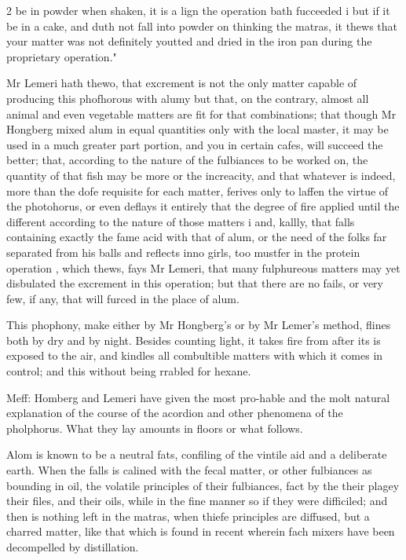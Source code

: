 \documentclass[10pt]{article}
\begin{document}
\begin{multicols}{2}\raggedcolumns
be in powder when shaken, it is a lign the operation bath fucceeded i but if it be in a cake, and duth not fall into powder on thinking the matras, it thews that your matter was not definitely youtted and dried in the iron pan during the proprietary operation."

Mr Lemeri hath thewo, that excrement is not the only matter capable of producing this phofhorous with alumy but that, on the contrary, almost all animal and even vegetable matters are fit for that combinations; that though Mr Hongberg mixed alum in equal quantities only with the local master, it may be used in a much greater part portion, and you in certain cafes, will succeed the better; that, according to the nature of the fulbiances to be worked on, the quantity of that fish may be more or the increacity, and that whatever is indeed, more than the dofe requisite for each matter, ferives only to laffen the virtue of the photohorus, or even deflays it entirely that the degree of fire applied until the different according to the nature of those matters i and, kallly, that falls containing exactly the fame acid with that of alum, or the need of the folks far separated from his balls and reflects inno girls, too mustfer in the protein operation , which thews, fays Mr Lemeri, that many fulphureous matters may yet disbulated the excrement in this operation; but that there are no fails, or very few, if any, that will furced in the place of alum.

This phophony, make either by Mr Hongberg’s or by Mr Lemer’s method, flines both by dry and by night. Besides counting light, it takes fire from after its is exposed to the air, and kindles all combultible matters with which it comes in control; and this without being rrabled for hexane.

Meff: Homberg and Lemeri have given the most pro-hable and the molt natural explanation of the course of the acordion and other phenomena of the pholphorus. What they lay amounts in floors or what follows.

Alom is known to be a neutral fats, confiling of the vintile aid and a deliberate earth. When the falls is calined with the fecal matter, or other fulbiances as bounding in oil, the volatile principles of their fulbiances, fact by the their plagey their files, and their oils, while in the fine manner so if they were difficiled; and then is nothing left in the matras, when thiefe principles are diffused, but a charred matter, like that which is found in recent wherein fach mixers have been decompelled by distillation.


\end{multicols}
\end{document}
